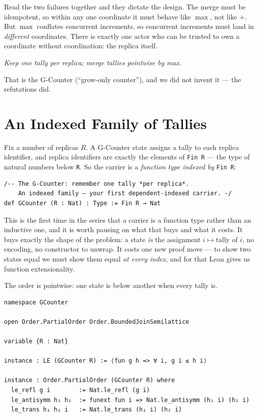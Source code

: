 \documentclass[12pt, a4paper, openright]{book}
\theoremstyle{thmstyle}
\theoremstyle{defstyle}
\newcommand{\lc}[1]{\texttt{#1}}
\newcounter{refutation}[chapter]
\begin{document}
Read the two failures together and they dictate the design. The merge
must be idempotent, so within any one coordinate it must behave like
$\max$, not like $+$. But $\max$ conflates concurrent increments, so
concurrent increments must land in \emph{different} coordinates. There is
exactly one actor who can be trusted to own a coordinate without
coordination: the replica itself.

\emph{Keep one tally per replica; merge tallies pointwise by max.}

That is the G-Counter (``grow-only counter''), and we did not invent it
--- the refutations did.

\section{An Indexed Family of Tallies}

Fix a number of replicas $R$. A G-Counter state assigns a tally to each
replica identifier, and replica identifiers are exactly the elements of
\lc{Fin R} --- the type of natural numbers below \lc{R}. So the carrier is
a \emph{function type indexed by} \lc{Fin R}:

\begin{verbatim}
/-- The G-Counter: remember one tally *per replica*.
    An indexed family — your first dependent-indexed carrier. -/
def GCounter (R : Nat) : Type := Fin R → Nat
\end{verbatim}

This is the first time in the series that a carrier is a function type
rather than an inductive one, and it is worth pausing on what that buys
and what it costs. It buys exactly the shape of the problem: a state
\emph{is} the assignment $i \mapsto \text{tally of } i$, no encoding, no
constructor to unwrap. It costs one new proof move --- to show two states
equal we must show them equal \emph{at every index}, and for that Lean
gives us function extensionality.

The order is pointwise: one state is below another when every tally is.

\begin{verbatim}
namespace GCounter

open Order.PartialOrder Order.BoundedJoinSemilattice

variable {R : Nat}

instance : LE (GCounter R) := ⟨fun g h => ∀ i, g i ≤ h i⟩

instance : Order.PartialOrder (GCounter R) where
  le_refl g i        := Nat.le_refl (g i)
  le_antisymm h₁ h₂  := funext fun i => Nat.le_antisymm (h₁ i) (h₂ i)
  le_trans h₁ h₂ i   := Nat.le_trans (h₁ i) (h₂ i)
\end{verbatim}
\end{document}
